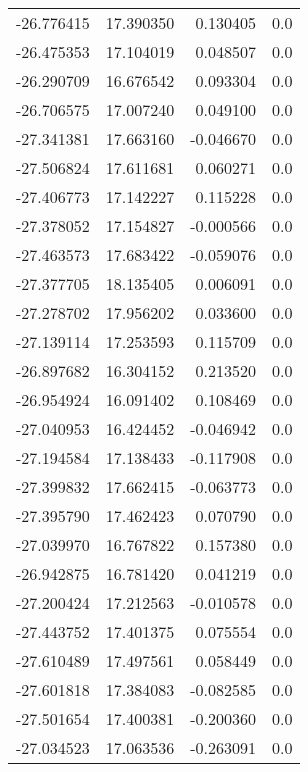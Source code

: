 \begin{tabular}{rrrr}
      -26.776415 &        17.390350 &    0.130405 &   0.0 \\
      -26.475353 &        17.104019 &    0.048507 &   0.0 \\
      -26.290709 &        16.676542 &    0.093304 &   0.0 \\
      -26.706575 &        17.007240 &    0.049100 &   0.0 \\
      -27.341381 &        17.663160 &   -0.046670 &   0.0 \\
      -27.506824 &        17.611681 &    0.060271 &   0.0 \\
      -27.406773 &        17.142227 &    0.115228 &   0.0 \\
      -27.378052 &        17.154827 &   -0.000566 &   0.0 \\
      -27.463573 &        17.683422 &   -0.059076 &   0.0 \\
      -27.377705 &        18.135405 &    0.006091 &   0.0 \\
      -27.278702 &        17.956202 &    0.033600 &   0.0 \\
      -27.139114 &        17.253593 &    0.115709 &   0.0 \\
      -26.897682 &        16.304152 &    0.213520 &   0.0 \\
      -26.954924 &        16.091402 &    0.108469 &   0.0 \\
      -27.040953 &        16.424452 &   -0.046942 &   0.0 \\
      -27.194584 &        17.138433 &   -0.117908 &   0.0 \\
      -27.399832 &        17.662415 &   -0.063773 &   0.0 \\
      -27.395790 &        17.462423 &    0.070790 &   0.0 \\
      -27.039970 &        16.767822 &    0.157380 &   0.0 \\
      -26.942875 &        16.781420 &    0.041219 &   0.0 \\
      -27.200424 &        17.212563 &   -0.010578 &   0.0 \\
      -27.443752 &        17.401375 &    0.075554 &   0.0 \\
      -27.610489 &        17.497561 &    0.058449 &   0.0 \\
      -27.601818 &        17.384083 &   -0.082585 &   0.0 \\
      -27.501654 &        17.400381 &   -0.200360 &   0.0 \\
      -27.034523 &        17.063536 &   -0.263091 &   0.0 \\

\end{tabular}
